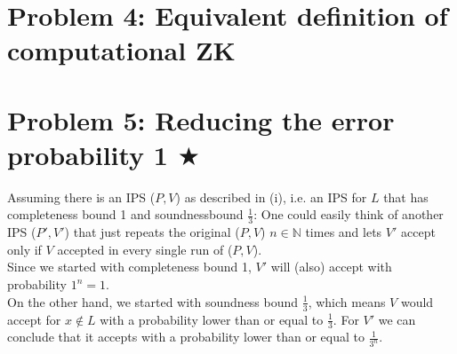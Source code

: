 \documentclass[12pt,pdftex,a4paper]{article}
\begin{document}
\section*{Problem 4: Equivalent definition of computational ZK}


\section*{Problem 5: Reducing the error probability 1 $\bigstar$}
Assuming there is an IPS ($P, V$) as described in (i), i.e. an IPS for $L$ that has completeness bound 1 and soundnessbound $\frac{1}{3}$: One could easily think of another IPS ($P', V'$) that just repeats the original ($P, V$) $n\in \mathbb{N}$ times and lets $V'$ accept only if $V$ accepted in every single run of ($P, V$).\\
Since we started with completeness bound 1, $V'$ will (also) accept with probability $1^{n} = 1$.\\
On the other hand, we started with soundness bound $\frac{1}{3}$, which means $V$ would accept for $x\notin L$ with a probability lower than or equal to $\frac{1}{3}$. For $V'$ we can conclude that it accepts with a probability lower than or equal to $\frac{1}{3^n}$. %
\end{document}
